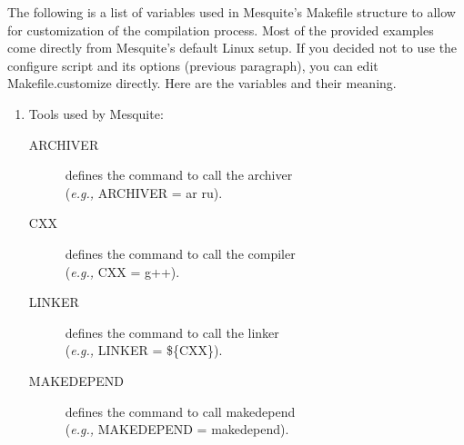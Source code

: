 \documentclass[letter]{report}
\begin{document}
The following is a list of variables used in Mesquite's Makefile
structure to allow for customization of the compilation process.
Most of the provided examples come directly from Mesquite's default
Linux setup. If you decided not to use the configure script and its options (previous paragraph),
you can edit Makefile.customize directly. Here are the variables and their meaning.
\begin{enumerate}

\item Tools used by Mesquite:
  \begin{description}
  \item[ARCHIVER] defines the command to call the archiver\\
    	({\it e.g.,} ARCHIVER = ar ru).
  \item[CXX] defines the command to call the compiler\\
	({\it e.g.,} CXX = g++).
  \item [LINKER] defines the command to call the linker\\
	({\it e.g.,} LINKER = \$\{CXX\}).
  \item[MAKEDEPEND] defines the command to call makedepend\\
	({\it e.g.,} MAKEDEPEND = makedepend).
  \end{description}


\end{enumerate}
\end{document}
